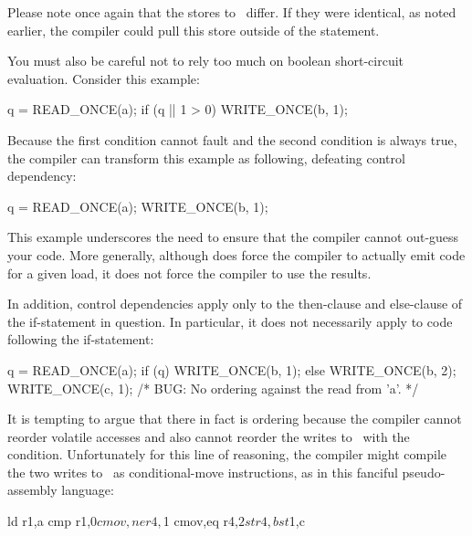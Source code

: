 
Please note once again that the stores to~ differ.
If they were identical, as noted earlier, the compiler could pull this
store outside of the  statement.

You must also be careful not to rely too much on boolean short-circuit
evaluation.
Consider this example:

\begin{VerbatimU}
	q = READ_ONCE(a);
	if (q || 1 > 0)
		WRITE_ONCE(b, 1);
\end{VerbatimU}

Because the first condition cannot fault and the second condition is
always true, the compiler can transform this example as following,
defeating control dependency:

\begin{VerbatimU}
	q = READ_ONCE(a);
	WRITE_ONCE(b, 1);
\end{VerbatimU}

This example underscores the need to ensure that the compiler cannot
out-guess your code.  More generally, although  does force
the compiler to actually emit code for a given load, it does not force
the compiler to use the results.

In addition, control dependencies apply only to the then-clause and
else-clause of the if-statement in question.
In particular, it does not necessarily apply to code following the
if-statement:

\begin{VerbatimU}
	q = READ_ONCE(a);
	if (q) {
		WRITE_ONCE(b, 1);
	} else {
		WRITE_ONCE(b, 2);
	}
	WRITE_ONCE(c, 1);  /* BUG: No ordering against the read from 'a'. */
\end{VerbatimU}

It is tempting to argue that there in fact is ordering because the
compiler cannot reorder volatile accesses and also cannot reorder
the writes to~ with the condition.
Unfortunately for this line of reasoning, the compiler might compile
the two writes to~ as conditional-move instructions, as in this
fanciful pseudo-assembly language:

\begin{VerbatimU}
	ld r1,a
	cmp r1,$0
	cmov,ne r4,$1
	cmov,eq r4,$2
	st r4,b
	st $1,c
\end{VerbatimU}

